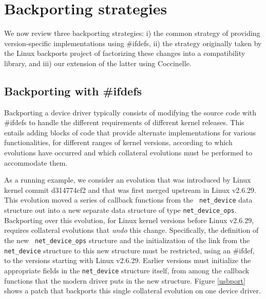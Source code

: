\section{Backporting strategies}
\label{strategies}

We now review three backporting strategies: i) the common strategy of
providing version-specific implementations using \#ifdefs, ii) the strategy
originally taken by the Linux backports project of factorizing these
changes into a compatibility library, and iii) our extension of the latter
using Coccinelle.

\subsection{Backporting with \#ifdefs}

Backporting a device driver typically consists of modifying the source code
with \#ifdefs to handle the different requirements of different kernel
releases.  This entails adding blocks of code that provide alternate
implementations for various functionalities, for different ranges of kernel
versions, according to which evolutions have occurred and which collateral
evolutions must be performed to accommodate them.

As a running example, we consider an evolution that was introduced by Linux
kernel commit d314774cf2 and that was first merged upstream in Linux
v2.6.29.  This evolution moved a series of callback functions from the {\tt
  net\_\-device} data structure out into a new separate data structure of
type {\tt net\_\-device\_\-ops}.  Backporting over this evolution, for Linux
kernel versions before Linux v2.6.29, requires collateral evolutions that
{\em undo} this change.  Specifically, the definition of the new {\tt
  net\_\-device\_\-ops} structure and the initialization of the link from the
{\tt net\_\-device} structure to this new structure must be restricted, using
an \#ifdef, to the versions starting with Linux v2.6.29.  Earlier versions
must initialize the appropriate fields in the {\tt net\_\-device} structure
itself, from among the callback functions that the modern driver puts in the
new structure.  Figure \ref{usbport} shows a patch that backports this
single collateral evolution on one device driver.

